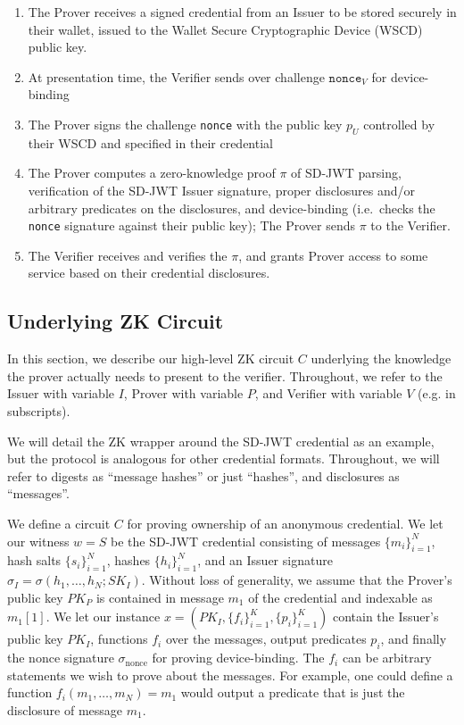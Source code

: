 \begin{enumerate}
\item The Prover receives a signed credential from an Issuer to be stored securely in their wallet, issued to the Wallet Secure Cryptographic Device (WSCD) public key.
\item At presentation time, the Verifier sends over challenge $\texttt{nonce}_V$ for device-binding
\item The Prover signs the challenge \texttt{nonce} with the public key $p_U$ controlled by their WSCD and specified in their credential
\item The Prover computes a zero-knowledge proof $\pi$ of SD-JWT parsing, verification of the SD-JWT Issuer signature, 
proper disclosures and/or arbitrary predicates on the disclosures, and device-binding 
(i.e.\ checks the \texttt{nonce} signature against their public key); The Prover sends $\pi$ to the Verifier.
\item The Verifier receives and verifies the $\pi$, and grants Prover access to some service based on their credential disclosures.
\end{enumerate}

\subsection{Underlying ZK Circuit}

In this section, we describe our high-level ZK circuit $C$ underlying the knowledge the prover actually needs to present to the verifier.
Throughout, we refer to the Issuer with variable $I$, Prover with variable $P$, and Verifier with variable $V$ (e.g. in subscripts). 

We will detail the ZK wrapper around the SD-JWT credential as an example, but the protocol is analogous for other credential formats. 
Throughout, we will refer to digests as ``message hashes'' or just ``hashes'', and disclosures as ``messages''.

We define a circuit $C$ for proving ownership of an anonymous credential. 
We let our witness $w = S$ be the SD-JWT credential consisting of messages $\{m_i\}_{i=1}^N$, hash salts $\{s_i\}_{i=1}^N$, 
hashes $\{h_i\}_{i=1}^N$, and an Issuer signature $\sigma_I = \sigma(h_1, \dots, h_N; SK_I)$. 
Without loss of generality, we assume that the Prover's public key $PK_P$ is contained in message $m_1$ of the credential and indexable as $m_1[1]$.
We let our instance $x = (PK_I, \{f_i\}_{i=1}^K, \{p_i\}_{i=1}^K)$ contain the Issuer's public key $PK_I$, functions $f_i$ over the messages, 
output predicates $p_i$, and finally the nonce signature $\sigma_{\text{nonce}}$ for proving device-binding. 
The $f_i$ can be arbitrary statements we wish to prove about the messages. For example, one could define a function $f_i(m_1, \dots, m_N) = m_1$ would output a predicate that is just the disclosure of message $m_1$.

